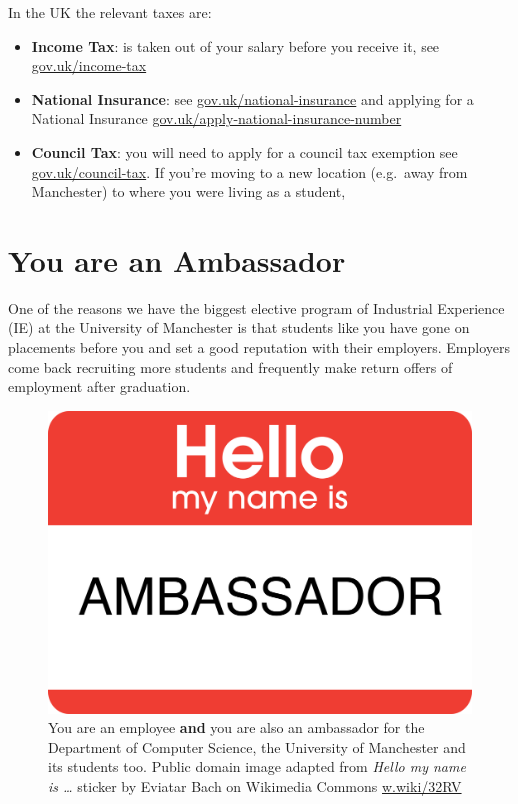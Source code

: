 \documentclass[
]{book}
\providecommand{\tightlist}{%
  \setlength{\itemsep}{0pt}\setlength{\parskip}{0pt}}
\begin{document}
In the UK the relevant taxes are:

\begin{itemize}
\tightlist
\item
  \textbf{Income Tax}: is taken out of your salary before you receive it, see \href{https://www.gov.uk/income-tax}{gov.uk/income-tax} \citep{income-tax}
\item
  \textbf{National Insurance}: see \href{https://www.gov.uk/national-insurance}{gov.uk/national-insurance} \citep{national} and applying for a National Insurance \href{https://www.gov.uk/apply-national-insurance-number}{gov.uk/apply-national-insurance-number} \citep{apply}
\item
  \textbf{Council Tax}: you will need to apply for a council tax exemption see \href{https://www.gov.uk/council-tax}{gov.uk/council-tax}\citep{council-tax}. If you're moving to a new location (e.g.~away from Manchester) to where you were living as a student, \citep{exemption1, exemption2}
\end{itemize}

\section{You are an Ambassador}\label{ambassador}

One of the reasons we have the biggest elective program of Industrial Experience (IE) at the University of Manchester is that students like you have gone on placements before you and set a good reputation with their employers. Employers come back recruiting more students and frequently make return offers of employment after graduation.

\begin{figure}

{\centering \includegraphics[width=0.8\linewidth]{images/ambassador} 

}

\caption{You are an employee \textbf{and} you are also an ambassador for the Department of Computer Science, the University of Manchester and its students too. Public domain image adapted from \emph{Hello my name is \ldots{}} sticker by Eviatar Bach on Wikimedia Commons \href{https://w.wiki/32RV}{w.wiki/32RV}}\label{fig:ambassador-fig}
\end{figure}
\end{document}
